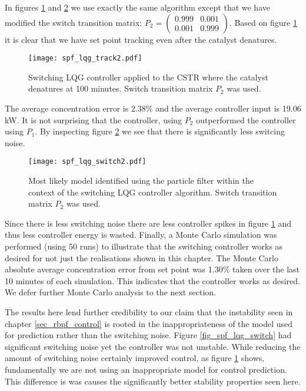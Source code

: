 In figures \ref{fig_spf_lqg_track2} and \ref{fig_spf_lqg_switch2} we use exactly the same algorithm except that we have modified the switch transition matrix: $P_2=\begin{pmatrix}
0.999 & 0.001 \\ 0.001 & 0.999
\end{pmatrix}$. Based on figure \ref{fig_spf_lqg_track2} it is clear that we have set point tracking even after the catalyst denatures.
\begin{figure}[H] 
\centering
\texttt{[image: spf\_lqg\_track2.pdf]}
\caption{Switching LQG controller applied to the CSTR where the catalyst denatures at 100 minutes. Switch transition matrix $P_2$ was used.}
\label{fig_spf_lqg_track2}
\end{figure}
The average concentration error is 2.38\% and the average controller input is 19.06 kW. It is not surprising that the controller, using $P_2$ outperformed the controller using $P_1$. By inspecting figure \ref{fig_spf_lqg_switch2} we see that there is significantly less switcing noise.  
\begin{figure}[H] 
\centering
\texttt{[image: spf\_lqg\_switch2.pdf]}
\caption{Most likely model identified using the particle filter within the context of the switching LQG controller algorithm. Switch transition matrix $P_2$ was used.}
\label{fig_spf_lqg_switch2}
\end{figure}
Since there is less switching noise there are less controller spikes in figure \ref{fig_spf_lqg_track2} and thus less controller energy is wasted. Finally, a Monte Carlo simulation was performed (using 50 runs) to illustrate that the switching controller works as desired for not just the realisations shown in this chapter. The Monte Carlo absolute average concentration error from set point was 1.30\% taken over the last 10 minutes of each simulation. This indicates that the controller works as desired. We defer further Monte Carlo analysis to the next section.

The results here lend further credibility to our claim that the instability seen in chapter \ref{sec_rbpf_control} is rooted in the inappropriateness of the model used for prediction rather than the switching noise. Figure \ref{fig_spf_lqg_switch} had significant switching noise yet the controller was not unstable. While reducing the amount of switching noise certainly improved control, as figure \ref{fig_spf_lqg_track2} shows, fundamentally we are not using an inappropriate model for control prediction. This difference is was causes the significantly better stability properties seen here.

